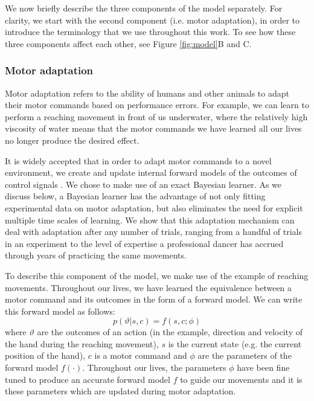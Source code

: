 \documentclass[a4paper,doc,floatsintext,natbib]{apa6}
\def \fref #1{Figure \ref{#1}}     %
\begin{document}
We now briefly describe the three components of the model separately. For clarity, we start with the second component (i.e. motor adaptation), in order to introduce the terminology that we use throughout this work. To see how these three components affect each other, see \fref{fig:model}B and C.

\subsubsection{Motor adaptation}
Motor adaptation refers to the ability of humans and other animals to adapt their motor commands based on performance errors. For example, we can learn to perform a reaching movement in front of us underwater, where the relatively high viscosity of water means that the motor commands we have learned all our lives no longer produce the desired effect.

It is widely accepted that in order to adapt motor commands to a novel environment, we create and update internal forward models of the outcomes of control signals \citep{Wolpert_Multiple_1998}. We chose to make use of an exact Bayesian learner. As we discuss below, a Bayesian learner has the advantage of not only fitting experimental data on motor adaptation, but also eliminates the need for explicit multiple time scales of learning. We show that this adaptation mechanism can deal with adaptation after any number of trials, ranging from a handful of trials in an experiment to the level of expertise a professional dancer has accrued through years of practicing the same movements.

To describe this component of the model, we make use of the example of reaching movements. Throughout our lives, we have learned the equivalence between a motor command and its outcomes in the form of a forward model. We can write this forward model as follows:
\begin{equation}
p(\vartheta | s, c) = f(s, c; \phi) \label{eqn:forward-model}
\end{equation}
where $\vartheta$ are the outcomes of an action (in the example, direction and velocity of the hand during the reaching movement), $s$ is the current state (e.g. the current position of the hand), $c$ is a motor command and $\phi$ are the parameters of the forward model $f(\cdot)$. Throughout our lives, the parameters $\phi$ have been fine tuned to produce an accurate forward model $f$ to guide our movements and it is these parameters which are updated during motor adaptation.
\end{document}
